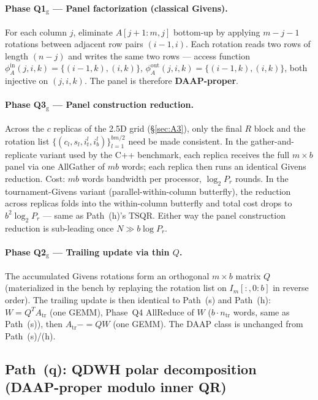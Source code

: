 \documentclass[11pt]{article}
\begin{document}
\paragraph{Phase Q1$_{\mathrm{g}}$ --- Panel factorization (classical Givens).}
For each column $j$, eliminate $A[j{+}1{:}m, j]$ bottom-up by applying
$m{-}j{-}1$ rotations between adjacent row pairs $(i{-}1, i)$.  Each
rotation reads two rows of length $(n - j)$ and writes the same two
rows --- access function
$\phi^{\text{in}}_A(j, i, k) = \{(i{-}1, k), (i, k)\}$,
$\phi^{\text{out}}_A(j, i, k) = \{(i{-}1, k), (i, k)\}$, both injective
on $(j, i, k)$.  The panel is therefore \textbf{DAAP-proper}.

\paragraph{Phase Q3$_{\mathrm{g}}$ --- Panel construction reduction.}
Across the $c$ replicas of the 2.5D grid (\S\ref{sec:A3}), only the
final $R$ block and the rotation list $\{(c_l, s_l, i_t^l, i_b^l)\}_{l=1}^{bm/2}$
need be made consistent.  In the gather-and-replicate variant used by
the C++ benchmark, each replica receives the full $m \times b$ panel
via one AllGather of $mb$ words; each replica then runs an identical
Givens reduction.  Cost: $mb$ words bandwidth per processor,
$\log_2 P_r$ rounds.  In the tournament-Givens variant
(parallel-within-column butterfly), the reduction across replicas
folds into the within-column butterfly and total cost drops to
$b^2 \log_2 P_r$ --- same as Path~(h)'s TSQR.  Either way the panel
construction reduction is sub-leading once $N \gg b \log P_r$.

\paragraph{Phase Q2$_{\mathrm{g}}$ --- Trailing update via thin $Q$.}
The accumulated Givens rotations form an orthogonal $m \times b$
matrix $Q$ (materialized in the bench by replaying the rotation list
on $I_m[:, 0{:}b]$ in reverse order).  The trailing update is then
identical to Path~(s) and Path~(h):
$W = Q^T A_{\text{tr}}$ (one GEMM), Phase~Q4 AllReduce of $W$
($b \cdot n_{\mathrm{tr}}$ words, same as Path~(s)), then
$A_{\text{tr}} \mathrel{{-}{=}} Q W$ (one GEMM).  The DAAP class is
unchanged from Path~(s)/(h).

\subsection*{Path~(q): QDWH polar decomposition (DAAP-proper modulo inner QR)}
\label{sec:A1-DAAP-qdwh}
\end{document}
